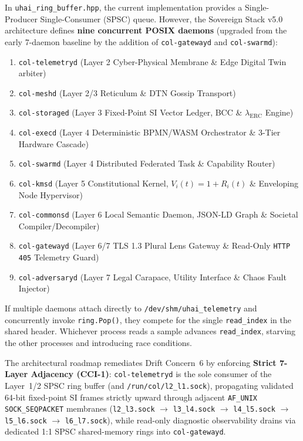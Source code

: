 In \texttt{uhai\_ring\_buffer.hpp}, the current implementation provides a Single-Producer Single-Consumer (SPSC) queue. However, the Sovereign Stack v5.0 architecture defines \textbf{nine concurrent POSIX daemons} (upgraded from the early 7-daemon baseline by the addition of \texttt{col-gatewayd} and \texttt{col-swarmd}):
\begin{enumerate}
    \item \texttt{col-telemetryd} (Layer 2 Cyber-Physical Membrane \& Edge Digital Twin arbiter)
    \item \texttt{col-meshd} (Layer 2/3 Reticulum \& DTN Gossip Transport)
    \item \texttt{col-storaged} (Layer 3 Fixed-Point SI Vector Ledger, BCC \& $\lambda_{\mathrm{ERC}}$ Engine)
    \item \texttt{col-execd} (Layer 4 Deterministic BPMN/WASM Orchestrator \& 3-Tier Hardware Cascade)
    \item \texttt{col-swarmd} (Layer 4 Distributed Federated Task \& Capability Router)
    \item \texttt{col-kmsd} (Layer 5 Constitutional Kernel, $V_i(t)=1+R_i(t)$ \& Enveloping Node Hypervisor)
    \item \texttt{col-commonsd} (Layer 6 Local Semantic Daemon, JSON-LD Graph \& Societal Compiler/Decompiler)
    \item \texttt{col-gatewayd} (Layer 6/7 TLS 1.3 Plural Lens Gateway \& Read-Only \texttt{HTTP 405} Telemetry Guard)
    \item \texttt{col-adversaryd} (Layer 7 Legal Carapace, Utility Interface \& Chaos Fault Injector)
\end{enumerate}

If multiple daemons attach directly to \texttt{/dev/shm/uhai\_telemetry} and concurrently invoke \texttt{ring.Pop()}, they compete for the single \texttt{read\_index} in the shared header. Whichever process reads a sample advances \texttt{read\_index}, starving the other processes and introducing race conditions.

The architectural roadmap remediates Drift Concern~6 by enforcing \textbf{Strict 7-Layer Adjacency (CCI-1)}: \texttt{col-telemetryd} is the sole consumer of the Layer~1/2 SPSC ring buffer (and \texttt{/run/col/l2\_l1.sock}), propagating validated 64-bit fixed-point SI frames strictly upward through adjacent \texttt{AF\_UNIX} \texttt{SOCK\_SEQPACKET} membranes (\texttt{l2\_l3.sock} $\to$ \texttt{l3\_l4.sock} $\to$ \texttt{l4\_l5.sock} $\to$ \texttt{l5\_l6.sock} $\to$ \texttt{l6\_l7.sock}), while read-only diagnostic observability drains via dedicated 1:1 SPSC shared-memory rings into \texttt{col-gatewayd}.

